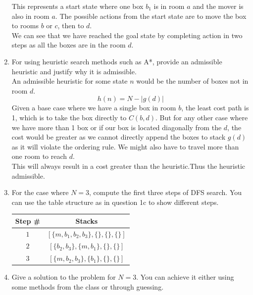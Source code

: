 \begin{enumerate}
\begin{center}
        \end{center}
        This represents a start state where one box $b_1$ is in room $a$ and the mover is also in room $a$. The possible actions from the start state are to move the box to rooms $b$ or $c$, then to $d$.\\
        We can see that we have reached the goal state by completing action in two steps as all the boxes are in the room $d$.
  \item For using heuristic search methods such as A*, provide an admissible heuristic and justify why it is admissible.\\[10pt]
        An admissible heuristic for some state $n$ would be the number of boxes not in room $d$.
        $$
          h(n) = N - \lvert g(d)\rvert
        $$
        Given a base case where we have a single box in room $b$, the least cost path is 1, which is to take the box directly to $C(b,d)$. But for any other case where we have more than 1 box or if our box is located diagonally from the $d$, the cost would be greater as we cannot directly append the boxes to stack $g(d)$ as it will violate the ordering rule. We might also have to travel more than one room to reach $d$.\\
        This will always result in a cost greater than the heuristic.Thus the heuristic admissible.
  \item For the case where $N = 3$, compute the first three steps of DFS search. You can use the table structure as in question 1c to show different steps.
        \begin{center}
          \bgroup
          \def\arraystretch{1.5}%
          \captionsetup{type=figure}
          \begin{tabular}{|c|c|}
            \hline
            Step \# & Stacks                                    \\
            \hline
            $1$     & $[\{m,b_1, b_2, b_3\}, \{\}, \{\}, \{\}]$ \\
            $2$     & $[\{b_2, b_3\}, \{m,b_1\}, \{\}, \{\}]$   \\
            $3$     & $[\{m,b_2, b_3\}, \{b_1\}, \{\}, \{\}]$   \\
            \hline
          \end{tabular}
          \egroup
        \end{center}
  \item Give a solution to the problem for $N = 3$. You can achieve it either using some methods from the class or through guessing.

\end{enumerate}
